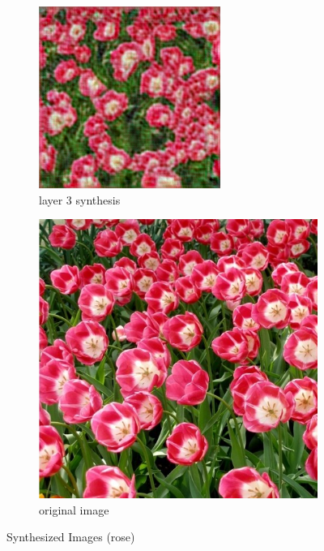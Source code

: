 \documentclass[11pt, oneside]{article}   	%
\begin{document}
\begin{figure}[H]
    \begin{subfigure}[b]{0.45\textwidth}
        \includegraphics[width=\textwidth]{figure/rose/layer_03_001}
        \caption{layer 3 synthesis}
    \end{subfigure}
        \begin{subfigure}[b]{0.45\textwidth}
        \includegraphics[width=\textwidth]{figure/rose/layer_00_001}
        \caption{original image}
    \end{subfigure}
    \caption{Synthesized Images (rose)}\label{fig:roses}
\end{figure}
\end{document}
